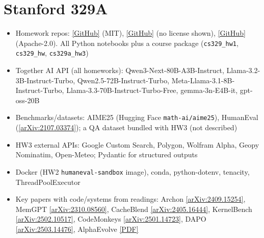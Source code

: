 \documentclass[10pt,oneside]{report}
\begin{document}
\section{Stanford 329A}
{\small\begin{itemize}
\item Homework repos: \href{https://github.com/stanford-cs329a/cs329a-homework1-fall2025-public}{[GitHub]} (MIT), \href{https://github.com/stanford-cs329a/cs329a-homework2-fall2025-public}{[GitHub]} (no license shown), \href{https://github.com/stanford-cs329a/cs329a-homework3-fall2025-public}{[GitHub]} (Apache-2.0). All Python notebooks plus a course package (\texttt{cs329\_\allowbreak{}hw1}, \texttt{cs329\_\allowbreak{}hw}, \texttt{cs329a\_\allowbreak{}hw3})
\item Together AI API (all homeworks): Qwen3-Next-80B-A3B-Instruct, Llama-3.2-3B-Instruct-Turbo, Qwen2.5-72B-Instruct-Turbo, Meta-Llama-3.1-8B-Instruct-Turbo, Llama-3.3-70B-Instruct-Turbo-Free, gemma-3n-E4B-it, gpt-oss-20B
\item Benchmarks/datasets: AIME25 (Hugging Face \texttt{math-ai/\allowbreak{}aime25}), HumanEval (\href{https://arxiv.org/abs/2107.03374}{[arXiv:2107.03374]}); a QA dataset bundled with HW3 (not described)
\item HW3 external APIs: Google Custom Search, Polygon, Wolfram Alpha, Geopy Nominatim, Open-Meteo; Pydantic for structured outputs
\item Docker (HW2 \texttt{humaneval-sandbox} image), conda, python-dotenv, tenacity, ThreadPoolExecutor
\item Key papers with code/systems from readings: Archon \href{https://www.arxiv.org/abs/2409.15254}{[arXiv:2409.15254]}, MemGPT \href{https://arxiv.org/abs/2310.08560}{[arXiv:2310.08560]}, CacheBlend \href{http://arxiv.org/abs/2405.16444}{[arXiv:2405.16444]}, KernelBench \href{https://arxiv.org/pdf/2502.10517}{[arXiv:2502.10517]}, CodeMonkeys \href{https://arxiv.org/abs/2501.14723}{[arXiv:2501.14723]}, DAPO \href{https://arxiv.org/abs/2503.14476}{[arXiv:2503.14476]}, AlphaEvolve \href{https://storage.googleapis.com/deepmind-media/DeepMind.com/Blog/alphaevolve-a-gemini-powered-coding-agent-for-designing-advanced-algorithms/AlphaEvolve.pdf}{[PDF]}
\end{itemize}}
\end{document}
